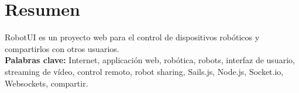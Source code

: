 \section*{Resumen}
\label{resumen}

RobotUI es un proyecto web para el control de dispositivos robóticos y compartirlos con otros usuarios.\\


\textbf{Palabras clave:} Internet, applicación web, robótica, robots, interfaz de usuario, streaming de vídeo, control remoto, robot sharing, Sails.js, Node.js, Socket.io, Websockets, compartir.

